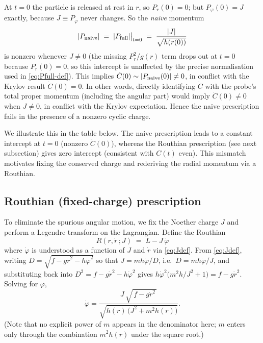 \documentclass[11pt]{article}
\begin{document}
At $t=0$ the particle is released at rest in $r$, so $P_r(0)=0$; but $P_\varphi(0)=J$ exactly, because $J\equiv P_\varphi$ never changes. So the {\it naive} momentum
\begin{equation*}
|P_{\rm naive}| \;=\; |P_{\rm full}| \big|_{t=0}
\;=\; \frac{|J|}{\sqrt{h(r(0))}}
\end{equation*}
is nonzero whenever $J\neq0$ (the missing $P_r^2/g(r)$ term drops out at $t=0$ because $P_r(0)=0$, so this intercept is unaffected by the precise normalisation used in \eqref{eq:Pfull-def}).  This implies $\dot C(0)\sim |P_{\rm naive}(0)|\neq0$, in conflict with the Krylov result $\dot C(0)=0$.  In other words, directly identifying $\dot C$ with the probe’s total proper momentum (including the angular part) would imply $\dot C(0)\neq0$ when $J\neq0$, in conflict with the Krylov expectation. Hence the naive prescription fails in the presence of a nonzero cyclic charge.

We illustrate this in the table below.  The naive prescription leads to a constant intercept at $t=0$ (nonzero $\dot C(0)$), whereas the Routhian prescription (see next subsection) gives zero intercept (consistent with $C(t)$ even).  This mismatch motivates fixing the conserved charge and rederiving the radial momentum via a Routhian.

\subsection{Routhian (fixed-charge) prescription}
\label{subsec:toy-routhian}

To eliminate the spurious angular motion, we fix the Noether charge $J$ and perform a Legendre transform on the Lagrangian.  Define the Routhian 
\begin{equation*}
R(r,\dot r\,;J) \;=\; L - J\,\dot\varphi
\end{equation*}
where $\dot\varphi$ is understood as a function of $J$ and $\dot r$ via \eqref{eq:Jdef}.  From \eqref{eq:Jdef}, writing $D=\sqrt{f-g\dot r^2-h\dot\varphi^2}$ so that $J=mh\dot\varphi/D$, i.e.\ $D=mh\dot\varphi/J$, and substituting back into $D^2=f-g\dot r^2-h\dot\varphi^2$ gives $h\dot\varphi^2\big(m^2h/J^2+1\big)=f-g\dot r^2$. Solving for $\dot\varphi$,
\begin{equation}
\dot\varphi = \frac{J\,\sqrt{\,f-g\dot r^2\,}}{\sqrt{h(r)\,\big(J^2+m^2 h(r)\big)}}.
\label{eq:phidot-solution}
\end{equation}
(Note that no explicit power of $m$ appears in the denominator here; $m$ enters only through the combination $m^2h(r)$ under the square root.)
\end{document}
